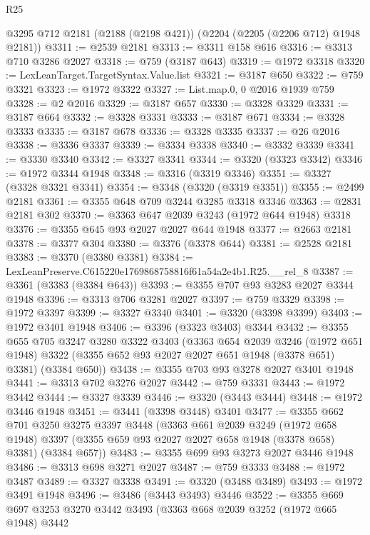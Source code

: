 \begin{lexlean}{R25}
\begin{coremodule}
    @3295
    @712
    @2181
    (@2188 (@2198 @421))
    (@2204 (@2205 (@2206 @712) @1948 @2181))
@3311 := @2539 @2181
@3313 := @3311 @158 @616
@3316 := @3313 @710 @3286 @2027
@3318 := @759 (@3187 @643)
@3319 := @1972 @3318
@3320 := LexLeanTarget.TargetSyntax.Value.list
@3321 := @3187 @650
@3322 := @759 @3321
@3323 := @1972 @3322
@3327 := List.map.{0, 0} @2016 @1939 @759
@3328 := @2 @2016
@3329 := @3187 @657
@3330 := @3328 @3329
@3331 := @3187 @664
@3332 := @3328 @3331
@3333 := @3187 @671
@3334 := @3328 @3333
@3335 := @3187 @678
@3336 := @3328 @3335
@3337 := @26 @2016
@3338 := @3336 @3337
@3339 := @3334 @3338
@3340 := @3332 @3339
@3341 := @3330 @3340
@3342 := @3327 @3341
@3344 := @3320 (@3323 @3342)
@3346 := @1972 @3344 @1948
@3348 := @3316 (@3319 @3346)
@3351 := @3327 (@3328 @3321 @3341)
@3354 := @3348 (@3320 (@3319 @3351))
@3355 := @2499 @2181
@3361 := @3355 @648 @709 @3244 @3285 @3318 @3346
@3363 := @2831 @2181 @302
@3370 := @3363 @647 @2039 @3243 (@1972 @644 @1948) @3318
@3376 := @3355 @645 @93 @2027 @2027 @644 @1948
@3377 := @2663 @2181
@3378 := @3377 @304
@3380 := @3376 (@3378 @644)
@3381 := @2528 @2181
@3383 := @3370 (@3380 @3381)
@3384 := LexLeanPreserve.C615220e1769868758816f61a54a2e4b1.R25.__rel_8
@3387 := @3361 (@3383 (@3384 @643))
@3393 := @3355 @707 @93 @3283 @2027 @3344 @1948
@3396 := @3313 @706 @3281 @2027
@3397 := @759 @3329
@3398 := @1972 @3397
@3399 := @3327 @3340
@3401 := @3320 (@3398 @3399)
@3403 := @1972 @3401 @1948
@3406 := @3396 (@3323 @3403) @3344
@3432 := @3355
    @655
    @705
    @3247
    @3280
    @3322
    @3403
    (@3363
      @654
      @2039
      @3246
      (@1972 @651 @1948)
      @3322
      (@3355 @652 @93 @2027 @2027 @651 @1948 (@3378 @651) @3381)
      (@3384 @650))
@3438 := @3355 @703 @93 @3278 @2027 @3401 @1948
@3441 := @3313 @702 @3276 @2027
@3442 := @759 @3331
@3443 := @1972 @3442
@3444 := @3327 @3339
@3446 := @3320 (@3443 @3444)
@3448 := @1972 @3446 @1948
@3451 := @3441 (@3398 @3448) @3401
@3477 := @3355
    @662
    @701
    @3250
    @3275
    @3397
    @3448
    (@3363
      @661
      @2039
      @3249
      (@1972 @658 @1948)
      @3397
      (@3355 @659 @93 @2027 @2027 @658 @1948 (@3378 @658) @3381)
      (@3384 @657))
@3483 := @3355 @699 @93 @3273 @2027 @3446 @1948
@3486 := @3313 @698 @3271 @2027
@3487 := @759 @3333
@3488 := @1972 @3487
@3489 := @3327 @3338
@3491 := @3320 (@3488 @3489)
@3493 := @1972 @3491 @1948
@3496 := @3486 (@3443 @3493) @3446
@3522 := @3355
    @669
    @697
    @3253
    @3270
    @3442
    @3493
    (@3363
      @668
      @2039
      @3252
      (@1972 @665 @1948)
      @3442

\end{coremodule}
\end{lexlean}
